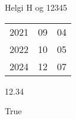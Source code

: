 \documentclass[10pt,a4paper]{article}
\begin{document}
	Helgi H og 12345

	\begin{tabular}{lll}
		2021 & 09 & 04\\
		2022 & 10 & 05\\
		2024 & 12 & 07
	\end{tabular}


	12.34
	
	
	True
\end{document}
